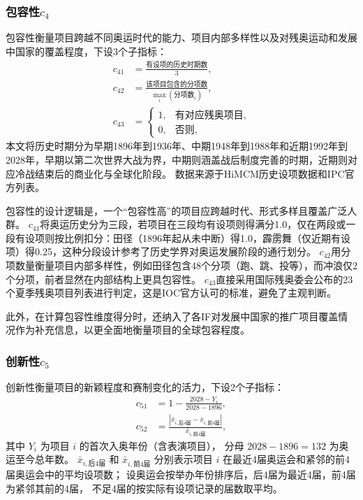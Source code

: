 \documentclass[twoside]{CUGThesis}
\begin{document}
\subsubsection{包容性$c_4$}

包容性衡量项目跨越不同奥运时代的能力、项目内部多样性以及对残奥运动和发展中国家的覆盖程度，下设3个子指标：
\begin{align}
c_{41} &= \frac{\text{有设项的历史时期数}}{3}, \\
c_{42} &= \frac{\text{该项目包含的分项数}}{\max_i(\text{分项数}_i)}, \\
c_{43} &=
\begin{cases}
1, & \text{有对应残奥项目}, \\
0, & \text{否则},
\end{cases}
\end{align}
本文将历史时期分为早期1896年到1936年、中期1948年到1988年和近期1992年到2028年，早期以第二次世界大战为界，中期则涵盖战后制度完善的时期，近期则对应冷战结束后的商业化与全球化阶段。
数据来源于HiMCM历史设项数据和IPC官方列表\cite{IPC2024}。

包容性的设计逻辑是，一个``包容性高''的项目应跨越时代、形式多样且覆盖广泛人群。
$c_{41}$将奥运历史分为三段，若项目在三段均有设项则得满分1.0，仅在两段或一段有设项则按比例扣分：田径（1896年起从未中断）得1.0，霹雳舞（仅近期有设项）得0.25，这种分段设计参考了历史学界对奥运发展阶段的通行划分。
$c_{42}$用分项数量衡量项目内部多样性，例如田径包含48个分项（跑、跳、投等），而冲浪仅2个分项，前者显然在内部结构上更具包容性。
$c_{43}$直接采用国际残奥委会公布的23个夏季残奥项目列表\cite{IPC2024}进行判定，这是IOC官方认可的标准，避免了主观判断。

此外，在计算包容性维度得分时，还纳入了各IF对发展中国家的推广项目覆盖情况作为补充信息，以更全面地衡量项目的全球包容程度。

\subsubsection{创新性$c_5$}

创新性衡量项目的新颖程度和赛制变化的活力，下设2个子指标：
\begin{align}
c_{51} &= 1 - \frac{2028 - Y_i}{2028 - 1896}, \\
c_{52} &= \frac{|\bar{x}_{i,\text{后4届}} - \bar{x}_{i,\text{前4届}}|}{\bar{x}_{i,\text{前4届}}},
\end{align}
其中 $Y_i$ 为项目 $i$ 的首次入奥年份（含表演项目），
分母 $2028-1896=132$ 为奥运至今总年数。
$\bar{x}_{i,\text{后4届}}$ 和 $\bar{x}_{i,\text{前4届}}$ 分别表示项目 $i$
在最近4届奥运会和紧邻的前4届奥运会中的平均设项数；
设奥运会按举办年份排序后，后4届为最近4届，前4届为紧邻其前的4届，
不足4届的按实际有设项记录的届数取平均。
\end{document}
